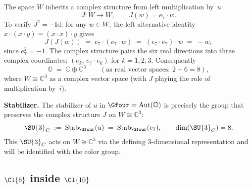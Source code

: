 The space $W$ inherits a complex structure from left multiplication
by~$u$:
\begin{equation}\label{eq:J-def}
  J\colon W \to W,
  \qquad
  J(w) = e_7 \cdot w.
\end{equation}
To verify $J^2 = -\mathrm{Id}$: for any $w\in W$, the left
alternative identity $x\cdot(x\cdot y) = (x\cdot x)\cdot y$ gives
\begin{equation}\label{eq:J-squared}
  J(J(w))
  \;=\; e_7\cdot(e_7\cdot w)
  \;=\; (e_7\cdot e_7)\cdot w
  \;=\; -w,
\end{equation}
since $e_7^2 = -1$.  The complex structure pairs the six real
directions into three complex coordinates:
$(e_k,\, e_7\cdot e_k)$ for $k=1,2,3$.  Consequently
\begin{equation}\label{eq:oct-split}
  \mathbb{O}
  \;=\; \mathbb{C} \oplus \mathbb{C}^3
  \qquad
  (\text{as real vector spaces: } 2 + 6 = 8),
\end{equation}
where $W\cong \mathbb{C}^3$ as a complex vector space (with $J$
playing the role of multiplication by~$i$).

\medskip
\noindent\textbf{Stabilizer.}
The stabilizer of $u$ in $\Gfour = \mathrm{Aut}(\mathbb{O})$
is precisely the group that preserves the complex structure $J$
on $W\cong\mathbb{C}^3$:
\begin{equation}\label{eq:SU3C-stab}
  \SU{3}_C
  \;:=\; \mathrm{Stab}_{\Gfour}(u)
  \;=\; \mathrm{Stab}_{\Gfour}(e_7),
  \qquad \dim(\SU{3}_C) = 8.
\end{equation}
This $\SU{3}_C$ acts on $W\cong\mathbb{C}^3$ via the defining
3-dimensional representation and will be identified with the
color group.

\subsection{\texorpdfstring{$\Cl{6}$}{Cl(6)} inside \texorpdfstring{$\Cl{10}$}{Cl(10)}}\label{sec:cl6}

